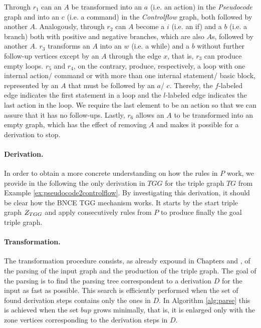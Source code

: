 Through $r_1$ can an $A$ be transformed into an $a$ (i.e. an action) in the \emph{Pseudocode} graph and into an $c$ (i.e. a command) in the \emph{Controlflow} graph, both followed by another $A$. Analogously, through $r_2$ can $A$ become a $i$ (i.e. an if) and a $b$ (i.e. a branch) both with positive and negative branches, which are also $A$s, followed by another $A$. $r_3$ transforms an $A$ into an $w$ (i.e. a while) and a $b$ without further follow-up vertices except by an $A$ through the edge $x$, that is, $r_3$ can produce empty loops. $r_5$ and $r_4$, on the contrary, produce, respectively, a loop with one internal action/ command or with more than one internal statement/ basic block, represented by an $A$ that must be followed by an $a$/ $c$. Thereby, the $f$-labeled edge indicates the first statement in a loop and the $l$-labeled edge indicates the last action in the loop. We require the last element to be an action so that we can assure that it has no follow-ups. Lastly, $r_6$ allows an $A$ to be transformed into an empty graph, which has the effect of removing $A$ and makes it possible for a derivation to stop.

\paragraph*{Derivation. } In order to obtain a more concrete understanding on how the rules in $P$ work, we provide in the following the only derivation in $TGG$ for the triple graph $TG$ from Example \ref{ex:pseudocode2controlflow}. By investigating this derivation, it should be clear how the BNCE TGG mechanism works. It starts by the start triple graph $Z_{TGG}$ and apply consecutively rules from $P$ to produce finally the goal triple graph.



\paragraph*{Transformation. } The transformation procedure consists, as already expound in Chapters \label{ch:ModelTransformation} \label{ch:PacExtension} and \label{ch:Implementation}, of the parsing of the input graph and the production of the triple graph. The goal of the parsing is to find the parsing tree correspondent to a derivation $D$ for the input as fast as possible. This search is efficiently performed when the set of found derivation steps contains only the ones in $D$. In Algorithm \ref{alg:parse} this is achieved when the set $bup$ grows minimally, that is, it is enlarged only with the zone vertices corresponding to the derivation steps in $D$.


